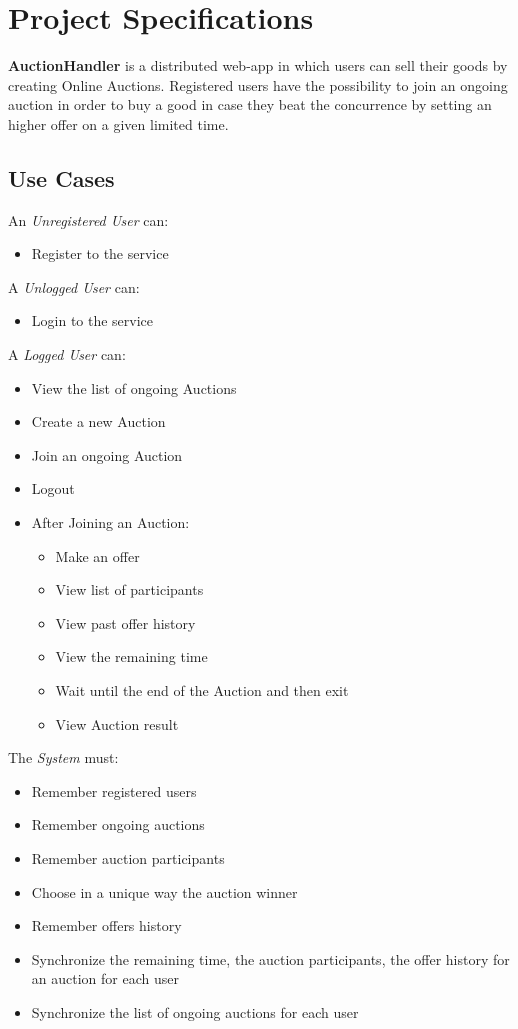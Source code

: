 \section{Project Specifications}

\textbf{AuctionHandler} is a distributed web-app in which users can sell their goods by creating Online Auctions. Registered users have the possibility to join an ongoing auction in order to buy a good in case they beat the concurrence by setting an higher offer on a given limited time.

\subsection{Use Cases}

An \textit{Unregistered User} can:
\begin{itemize}
	\item Register to the service
\end{itemize}
\noindent
A \textit{Unlogged User} can:
\begin{itemize}
	\item Login to the service
\end{itemize}
\noindent
A \textit{Logged User} can:
\begin{itemize}
	\item View the list of ongoing Auctions
	\item Create a new Auction
	\item Join an ongoing Auction
	\item Logout
	\item After Joining an Auction:
	\begin{itemize}
		\item Make an offer
		\item View list of participants
		\item View past offer history
		\item View the remaining time 
		\item Wait until the end of the Auction and then exit
		\item View Auction result
	\end{itemize}
\end{itemize}
The \textit{System} must:
\begin{itemize}
	\item Remember registered users
	\item Remember ongoing auctions
	\item Remember auction participants
	\item Choose in a unique way the auction winner
	\item Remember offers history
	\item Synchronize the remaining time, the auction participants, the offer history for an auction for each user
	\item Synchronize the list of ongoing auctions for each user
	
	
\end{itemize}
